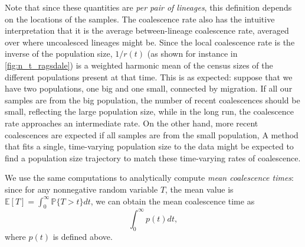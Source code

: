 \documentclass[12pt,halfline,a4paper]{ouparticle}
\begin{document}
Note that since these quantities are \emph{per pair of lineages},
this definition depends on the locations of the samples.
The coalescence rate also has the intuitive interpretation that 
it is the average between-lineage coalescence rate,
averaged over where uncoalesced lineages might be.
Since the local coalescence rate is the inverse of the population size,
$1/r(t)$ (as shown for instance in \autoref{fig:n_t_ragsdale})
is a weighted harmonic mean of the census sizes of the different populations present at that time.
This is as expected: suppose that we have two populations, one big and one small,
connected by migration.
If all our samples are from the big population, 
the number of recent coalescences should be small, reflecting the large population size,
while in the long run, the coalescence rate approaches an intermediate rate.
On the other hand, more recent coalescences are expected
if all samples are from the small population,
A method that fits a single, time-varying population size to the data
might be expected to find a population size trajectory
to match these time-varying rates of coalescence.

We use the same computations to analytically compute \emph{mean coalescence times}:
since for any nonnegative random variable $T$, the mean value is
$\mathbb{E}[T] = \int_0^\infty \mathbb{P}\{T > t\} dt$,
we can obtain the mean coalescence time as
$$
\int_0^\infty p(t) dt ,
$$
where $p(t)$ is defined above.
\end{document}
